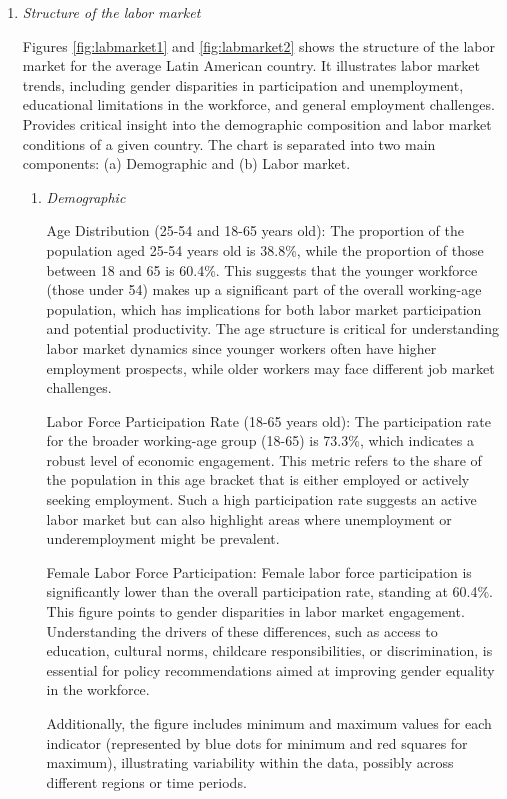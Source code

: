 \documentclass[english]{article}
\begin{document}
\begin{enumerate}
    \item\textit{Structure of the labor market } 

Figures \ref{fig:labmarket1} and \ref{fig:labmarket2} shows the structure of the labor market for the average Latin American country. It illustrates labor market trends, including gender disparities in participation and unemployment, educational limitations in the workforce, and general employment challenges. Provides critical insight into the demographic composition and labor market conditions of a given country. The chart is separated into two main components: (a) Demographic and (b) Labor market.

\begin{enumerate}
    \item\textit{Demographic}

Age Distribution (25-54 and 18-65 years old):
The proportion of the population aged 25-54 years old is 38.8\%, while the proportion of those between 18 and 65 is 60.4\%. This suggests that the younger workforce (those under 54) makes up a significant part of the overall working-age population, which has implications for both labor market participation and potential productivity. The age structure is critical for understanding labor market dynamics since younger workers often have higher employment prospects, while older workers may face different job market challenges.

Labor Force Participation Rate (18-65 years old):
The participation rate for the broader working-age group (18-65) is 73.3\%, which indicates a robust level of economic engagement. This metric refers to the share of the population in this age bracket that is either employed or actively seeking employment. Such a high participation rate suggests an active labor market but can also highlight areas where unemployment or underemployment might be prevalent.

Female Labor Force Participation:
Female labor force participation is significantly lower than the overall participation rate, standing at 60.4\%. This figure points to gender disparities in labor market engagement. Understanding the drivers of these differences, such as access to education, cultural norms, childcare responsibilities, or discrimination, is essential for policy recommendations aimed at improving gender equality in the workforce.

Additionally, the figure includes minimum and maximum values for each indicator (represented by blue dots for minimum and red squares for maximum), illustrating variability within the data, possibly across different regions or time periods.



\end{enumerate}
\end{enumerate}
\end{document}
